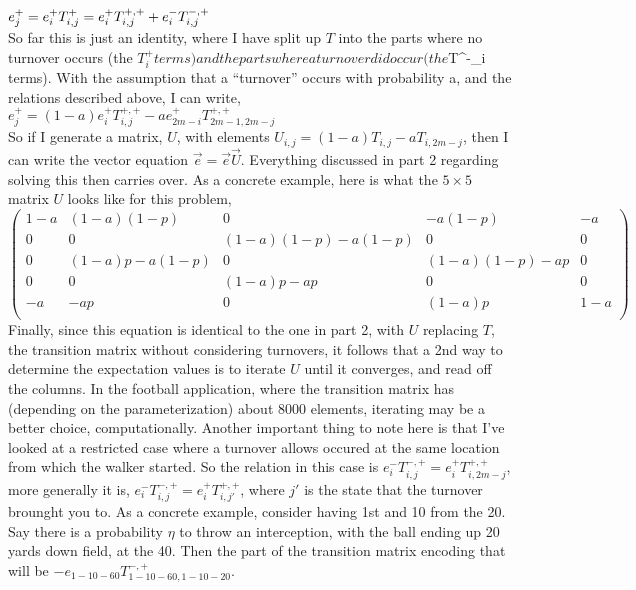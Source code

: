 \documentclass{article}
\begin{document}
$e^{+}_{j} = e^{+}_{i} T^{+}_{i,j} \\
= e^{+}_{i} T^{+,+}_{i,j}  + e^{-}_{i} T^{-,+}_{i,j} \\
$ \\

So far this is just an identity, where I have split up $T$ into the parts where no turnover occurs (the $T^{+}_{i} terms) and the parts where a turn over did occur (the $T^{-}_{i} terms). With the assumption that a ``turnover'' occurs with probability a, and the relations described above, I can write, \\

$e^{+}_{j} = (1-a) e^{+}_{i} T^{+,+}_{i,j} - a e^{+}_{2 m-i} T^{+,+}_{2 m -1, 2 m - j}$ \\

So if I generate a matrix, $U$, with elements $U_{i,j} = (1-a) T_{i,j} - a T_{i, 2m - j}$, then I can write the vector equation $\vec{e} = \vec{e} \vec{U}$. Everything discussed in part 2 regarding solving this then carries over. As a concrete example, here is what the $5 \times 5$ matrix $U$ looks like for this problem, \\

$
\left(
\begin{array}{ccccc}
 1-a & (1-a) (1-p) & 0 & -a (1-p) & -a \\
 0 & 0 & (1-a) (1-p)-a (1-p) & 0 & 0 \\
 0 & (1-a) p-a (1-p) & 0 & (1-a) (1-p)-a p & 0 \\
 0 & 0 & (1-a) p-a p & 0 & 0 \\
 -a & -a p & 0 & (1-a) p & 1-a \\
\end{array}
\right)
$ \\

Finally, since this equation is identical to the one in part 2, with $U$ replacing $T$, the transition matrix without considering turnovers, it follows that a 2nd way to determine the expectation values is to iterate $U$ until it converges, and read off the columns. In the football application, where the transition matrix has (depending on the parameterization) about 8000 elements, iterating may be a better choice, computationally. Another important thing to note here is that I've looked at a restricted case where a turnover allows occured at the same location from which the walker started. So the relation in this case is 
$e^{-}_{i} T^{-,+}_{i,j} = e^{+}_{i} T^{+,+}_{i,2 m -j}$, 
more generally it is,
$e^{-}_{i} T^{-,+}_{i,j} = e^{+}_{i} T^{+,+}_{i,j'}$, where $j'$ is the state that the turnover brounght you to.
As a concrete example, consider having 1st and 10 from the 20. Say there is a probability $\eta$ to throw an interception, with the ball ending up 20 yards down field, at the 40. Then the part of the transition matrix encoding that will be
$ - e_{1-10-60} T^{-,+}_{1-10-60,1-10-20}$.
\end{document}
